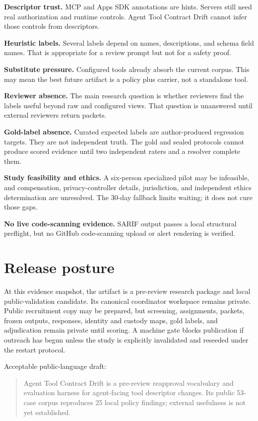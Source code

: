 \documentclass[11pt,letterpaper]{article}
\newcommand{\project}{Agent Tool Contract Drift}
\newcommand{\mcp}{MCP}
\newcommand{\sarif}{SARIF}
\begin{document}
\textbf{Descriptor trust.} \mcp{} and Apps SDK annotations are hints. Servers still need real authorization and runtime controls. \project{} cannot infer those controls from descriptors.

\textbf{Heuristic labels.} Several labels depend on names, descriptions, and schema field names. That is appropriate for a review prompt but not for a safety proof.

\textbf{Substitute pressure.} Configured tools already absorb the current corpus. This may mean the best future artifact is a policy plus carrier, not a standalone tool.

\textbf{Reviewer absence.} The main research question is whether reviewers find the labels useful beyond raw and configured views. That question is unanswered until external reviewers return packets.

\textbf{Gold-label absence.} Curated expected labels are author-produced regression targets. They are not independent truth. The gold and sealed protocols cannot produce scored evidence until two independent raters and a resolver complete them.

\textbf{Study feasibility and ethics.} A six-person specialized pilot may be infeasible, and compensation, privacy-controller details, jurisdiction, and independent ethics determination are unresolved. The 30-day fallback limits waiting; it does not cure those gaps.

\textbf{No live code-scanning evidence.} \sarif{} output passes a local structural preflight, but no GitHub code-scanning upload or alert rendering is verified.

\section{Release posture}

At this evidence snapshot, the artifact is a pre-review research package and local public-validation candidate. Its canonical coordinator workspace remains private. Public recruitment copy may be prepared, but screening, assignments, packets, frozen outputs, responses, identity and custody maps, gold labels, and adjudication remain private until scoring. A machine gate blocks publication if outreach has begun unless the study is explicitly invalidated and reseeded under the restart protocol.

Acceptable public-language draft:

\begin{quote}
\project{} is a pre-review reapproval vocabulary and evaluation harness for agent-facing tool descriptor changes. Its public 53-case corpus reproduces 25 local policy findings; external usefulness is not yet established.
\end{quote}
\end{document}
